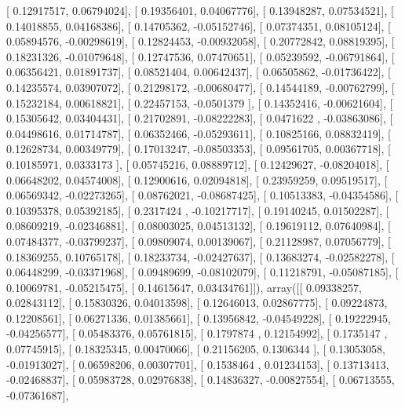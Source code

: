 \documentclass{article}
\begin{document}
       [ 0.12917517,  0.06794024],
       [ 0.19356401,  0.04067776],
       [ 0.13948287,  0.07534521],
       [ 0.14018855,  0.04168386],
       [ 0.14705362, -0.05152746],
       [ 0.07374351,  0.08105124],
       [ 0.05894576, -0.00298619],
       [ 0.12824453, -0.00932058],
       [ 0.20772842,  0.08819395],
       [ 0.18231326, -0.01079648],
       [ 0.12747536,  0.07470651],
       [ 0.05239592, -0.06791864],
       [ 0.06356421,  0.01891737],
       [ 0.08521404,  0.00642437],
       [ 0.06505862, -0.01736422],
       [ 0.14235574,  0.03907072],
       [ 0.21298172, -0.00680477],
       [ 0.14544189, -0.00762799],
       [ 0.15232184,  0.00618821],
       [ 0.22457153, -0.0501379 ],
       [ 0.14352416, -0.00621604],
       [ 0.15305642,  0.03404431],
       [ 0.21702891, -0.08222283],
       [ 0.0471622 , -0.03863086],
       [ 0.04498616,  0.01714787],
       [ 0.06352466, -0.05293611],
       [ 0.10825166,  0.08832419],
       [ 0.12628734,  0.00349779],
       [ 0.17013247, -0.08503353],
       [ 0.09561705,  0.00367718],
       [ 0.10185971,  0.0333173 ],
       [ 0.05745216,  0.08889712],
       [ 0.12429627, -0.08204018],
       [ 0.06648202,  0.04574008],
       [ 0.12900616,  0.02094818],
       [ 0.23959259,  0.09519517],
       [ 0.06569342, -0.02273265],
       [ 0.08762021, -0.08687425],
       [ 0.10513383, -0.04354586],
       [ 0.10395378,  0.05392185],
       [ 0.2317424 , -0.10217717],
       [ 0.19140245,  0.01502287],
       [ 0.08609219, -0.02346881],
       [ 0.08003025,  0.04513132],
       [ 0.19619112,  0.07640984],
       [ 0.07484377, -0.03799237],
       [ 0.09809074,  0.00139067],
       [ 0.21128987,  0.07056779],
       [ 0.18369255,  0.10765178],
       [ 0.18233734, -0.02427637],
       [ 0.13683274, -0.02582278],
       [ 0.06448299, -0.03371968],
       [ 0.09489699, -0.08102079],
       [ 0.11218791, -0.05087185],
       [ 0.10069781, -0.05215475],
       [ 0.14615647,  0.03434761]]), array([[ 0.09338257,  0.02843112],
       [ 0.15830326,  0.04013598],
       [ 0.12646013,  0.02867775],
       [ 0.09224873,  0.12208561],
       [ 0.06271336,  0.01385661],
       [ 0.13956842, -0.04549228],
       [ 0.19222945, -0.04256577],
       [ 0.05483376,  0.05761815],
       [ 0.1797874 ,  0.12154992],
       [ 0.1735147 ,  0.07745915],
       [ 0.18325345,  0.00470066],
       [ 0.21156205,  0.1306344 ],
       [ 0.13053058, -0.01913027],
       [ 0.06598206,  0.00307701],
       [ 0.1538464 ,  0.01234153],
       [ 0.13713413, -0.02468837],
       [ 0.05983728,  0.02976838],
       [ 0.14836327, -0.00827554],
       [ 0.06713555, -0.07361687],
\end{document}
